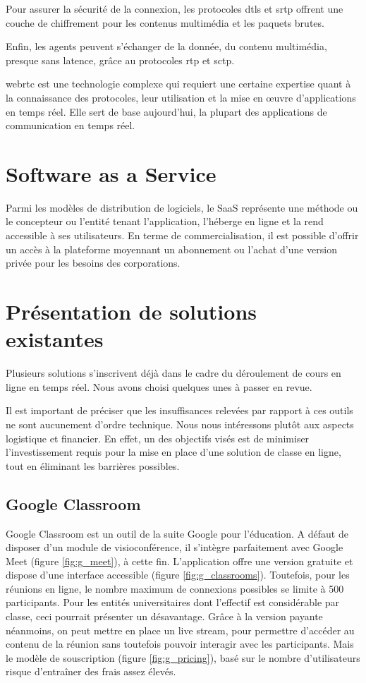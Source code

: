 Pour assurer la sécurité de la connexion, les protocoles \acrshort{dtls} et \acrshort{srtp} offrent une couche de chiffrement 
pour les contenus multimédia et les paquets brutes.

Enfin, les agents peuvent s'échanger de la donnée, du contenu multimédia, presque sans latence, grâce au protocoles \acrshort{rtp} et \acrshort{sctp}.

\acrshort{webrtc} est une technologie complexe qui requiert une certaine expertise quant à la connaissance des protocoles, 
leur utilisation et la mise en œuvre d'applications en temps réel. 
Elle sert de base aujourd’hui,  la plupart des applications de communication en temps réel.

\section{Software as a Service}
Parmi les modèles de distribution de logiciels, le SaaS représente une méthode ou le concepteur ou l'entité tenant l’application, 
l'héberge en ligne et la rend accessible à ses utilisateurs. 
En terme de commercialisation, il est possible d’offrir un accès à la plateforme moyennant un abonnement ou 
l’achat d’une version privée pour les besoins des corporations.

\section{Présentation de solutions existantes}
Plusieurs solutions s’inscrivent déjà dans le cadre du déroulement de cours en ligne en temps réel. 
Nous avons choisi quelques unes à passer en revue.

Il est important de préciser que les insuffisances relevées par rapport à ces outils ne sont aucunement d’ordre technique. 
Nous nous intéressons plutôt aux aspects logistique et financier. 
En effet, un des objectifs visés est de minimiser l’investissement requis pour la mise en place d’une solution de classe en ligne, 
tout en éliminant les barrières possibles.

\subsection{Google Classroom}
Google Classroom est un outil de la suite Google pour l'éducation. 
A défaut de disposer d’un module de visioconférence, il s'intègre parfaitement avec Google Meet (figure \ref{fig:g_meet}), à cette fin. 
L’application offre une version gratuite et dispose d’une interface accessible (figure \ref{fig:g_classrooms}). 
Toutefois, pour les réunions en ligne, le nombre maximum de connexions possibles se limite à 500 participants. 
Pour les entités universitaires dont l’effectif est considérable par classe, ceci pourrait présenter un désavantage. 
Grâce à la version payante néanmoins, on peut mettre en place un live stream, pour permettre d'accéder au contenu de 
la réunion sans toutefois pouvoir interagir avec les participants. 
Mais le modèle de souscription (figure \ref{fig:g_pricing}), basé sur le nombre d’utilisateurs risque d'entraîner des frais assez élevés.

